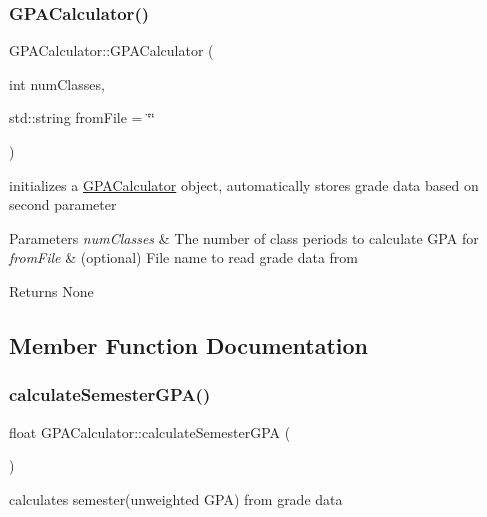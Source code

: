\subsubsection{\texorpdfstring{G\+P\+A\+Calculator()}{GPACalculator()}}
{\footnotesize\ttfamily G\+P\+A\+Calculator\+::\+G\+P\+A\+Calculator (\begin{DoxyParamCaption}\item[{int}]{num\+Classes,  }\item[{std\+::string}]{from\+File = {\ttfamily \char`\"{}\char`\"{}} }\end{DoxyParamCaption})}



initializes a \mbox{\hyperlink{class_g_p_a_calculator}{G\+P\+A\+Calculator}} object, automatically stores grade data based on second parameter 


\begin{DoxyParams}{Parameters}
{\em num\+Classes} & The number of class periods to calculate G\+PA for \\
\hline
{\em from\+File} & (optional) File name to read grade data from \\
\hline
\end{DoxyParams}
\begin{DoxyReturn}{Returns}
None 
\end{DoxyReturn}


\subsection{Member Function Documentation}
\mbox{\label{class_g_p_a_calculator_a225157e7c4783271b58ebeb7572c0796}} 
\subsubsection{\texorpdfstring{calculate\+Semester\+G\+P\+A()}{calculateSemesterGPA()}}
{\footnotesize\ttfamily float G\+P\+A\+Calculator\+::calculate\+Semester\+G\+PA (\begin{DoxyParamCaption}{ }\end{DoxyParamCaption})}



calculates semester(unweighted G\+P\+A) from grade data 

